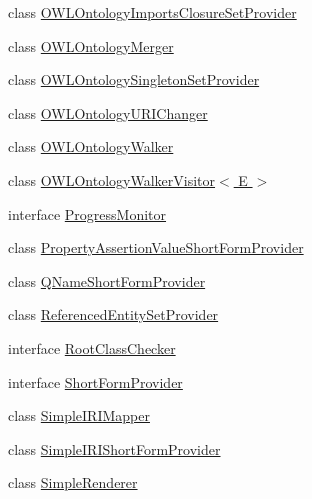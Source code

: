 \begin{DoxyCompactItemize}
\item 
class \hyperlink{classorg_1_1semanticweb_1_1owlapi_1_1util_1_1_o_w_l_ontology_imports_closure_set_provider}{O\-W\-L\-Ontology\-Imports\-Closure\-Set\-Provider}
\item 
class \hyperlink{classorg_1_1semanticweb_1_1owlapi_1_1util_1_1_o_w_l_ontology_merger}{O\-W\-L\-Ontology\-Merger}
\item 
class \hyperlink{classorg_1_1semanticweb_1_1owlapi_1_1util_1_1_o_w_l_ontology_singleton_set_provider}{O\-W\-L\-Ontology\-Singleton\-Set\-Provider}
\item 
class \hyperlink{classorg_1_1semanticweb_1_1owlapi_1_1util_1_1_o_w_l_ontology_u_r_i_changer}{O\-W\-L\-Ontology\-U\-R\-I\-Changer}
\item 
class \hyperlink{classorg_1_1semanticweb_1_1owlapi_1_1util_1_1_o_w_l_ontology_walker}{O\-W\-L\-Ontology\-Walker}
\item 
class \hyperlink{classorg_1_1semanticweb_1_1owlapi_1_1util_1_1_o_w_l_ontology_walker_visitor_3_01_e_01_4}{O\-W\-L\-Ontology\-Walker\-Visitor$<$ E $>$}
\item 
interface \hyperlink{interfaceorg_1_1semanticweb_1_1owlapi_1_1util_1_1_progress_monitor}{Progress\-Monitor}
\item 
class \hyperlink{classorg_1_1semanticweb_1_1owlapi_1_1util_1_1_property_assertion_value_short_form_provider}{Property\-Assertion\-Value\-Short\-Form\-Provider}
\item 
class \hyperlink{classorg_1_1semanticweb_1_1owlapi_1_1util_1_1_q_name_short_form_provider}{Q\-Name\-Short\-Form\-Provider}
\item 
class \hyperlink{classorg_1_1semanticweb_1_1owlapi_1_1util_1_1_referenced_entity_set_provider}{Referenced\-Entity\-Set\-Provider}
\item 
interface \hyperlink{interfaceorg_1_1semanticweb_1_1owlapi_1_1util_1_1_root_class_checker}{Root\-Class\-Checker}
\item 
interface \hyperlink{interfaceorg_1_1semanticweb_1_1owlapi_1_1util_1_1_short_form_provider}{Short\-Form\-Provider}
\item 
class \hyperlink{classorg_1_1semanticweb_1_1owlapi_1_1util_1_1_simple_i_r_i_mapper}{Simple\-I\-R\-I\-Mapper}
\item 
class \hyperlink{classorg_1_1semanticweb_1_1owlapi_1_1util_1_1_simple_i_r_i_short_form_provider}{Simple\-I\-R\-I\-Short\-Form\-Provider}
\item 
class \hyperlink{classorg_1_1semanticweb_1_1owlapi_1_1util_1_1_simple_renderer}{Simple\-Renderer}

\end{DoxyCompactItemize}
